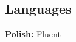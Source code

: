 \documentclass[margin,line]{resume}
\begin{document}
\begin{resume}
\section{\mysidestyle Languages}
\textbf{Polish: }\textnormal{Fluent}




\end{resume}   
\end{document}
